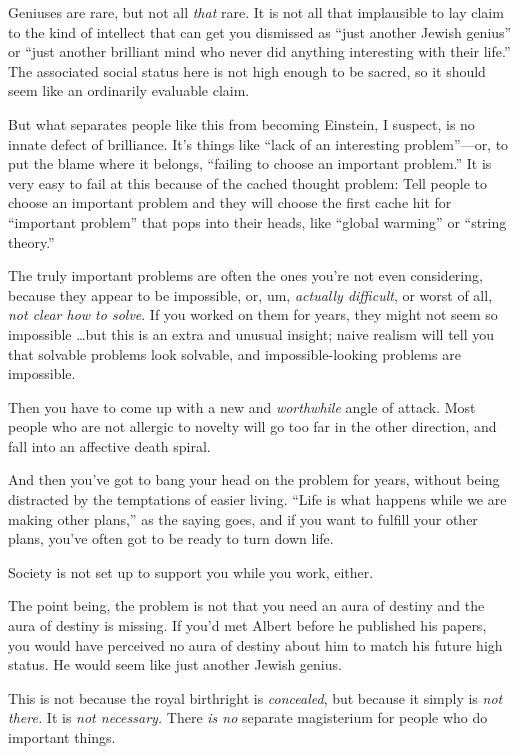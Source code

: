 {
 Geniuses are rare, but not all \textit{that} rare. It is not all
that implausible to lay claim to the kind of intellect that can get you
dismissed as ``just another Jewish
genius'' or ``just another brilliant
mind who never did anything interesting with their
life.'' The associated social status here is not high
enough to be sacred, so it should seem like an ordinarily evaluable
claim.}

{
 But what separates people like this from becoming Einstein, I
suspect, is no innate defect of brilliance. It's things
like ``lack of an interesting
problem''---or, to put the blame where it belongs,
``failing to choose an important
problem.'' It is very easy to fail at this because of
the cached thought problem: Tell people to choose an important problem
and they will choose the first cache hit for
``important problem'' that pops into
their heads, like ``global warming''
or ``string theory.''}

{
 The truly important problems are often the ones
you're not even considering, because they appear to be
impossible, or, um, \textit{actually difficult}, or worst of all,
\textit{not clear how to solve}. If you worked on them for years, they
might not seem so impossible \ldots but this is an extra and unusual
insight; naive realism will tell you that solvable problems look
solvable, and impossible-looking problems are impossible.}

{
 Then you have to come up with a new and \textit{worthwhile} angle
of attack. Most people who are not allergic to novelty will go too far
in the other direction, and fall into an affective death spiral.}

{
 And then you've got to bang your head on the
problem for years, without being distracted by the temptations of
easier living. ``Life is what happens while we are
making other plans,'' as the saying goes, and if you
want to fulfill your other plans, you've often got to
be ready to turn down life.}

{
 Society is not set up to support you while you work, either.}

{
 The point being, the problem is not that you need an aura of
destiny and the aura of destiny is missing. If you'd
met Albert before he published his papers, you would have perceived no
aura of destiny about him to match his future high status. He would
seem like just another Jewish genius.}

{
 This is not because the royal birthright is \textit{concealed},
but because it simply is \textit{not there.} It is \textit{not
necessary.} There \textit{is no} separate magisterium for people who do
important things.}

